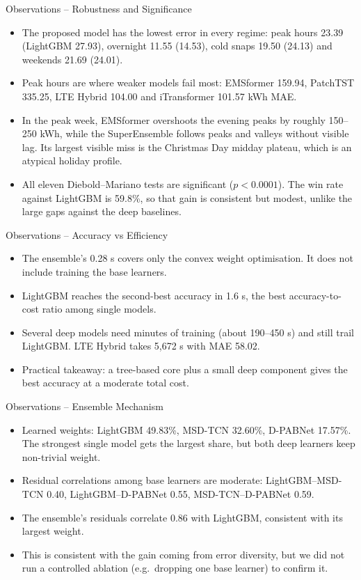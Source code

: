 \documentclass[aspectratio=169]{beamer}
\begin{document}
\begin{frame}{Observations -- Robustness and Significance}
  \small
  \begin{itemize}
    \item The proposed model has the lowest error in every regime: peak hours 23.39 (LightGBM 27.93), overnight 11.55 (14.53), cold snaps 19.50 (24.13) and weekends 21.69 (24.01).
    \item Peak hours are where weaker models fail most: EMSformer 159.94, PatchTST 335.25, LTE Hybrid 104.00 and iTransformer 101.57 kWh MAE.
    \item In the peak week, EMSformer overshoots the evening peaks by roughly 150--250 kWh, while the SuperEnsemble follows peaks and valleys without visible lag. Its largest visible miss is the Christmas Day midday plateau, which is an atypical holiday profile.
    \item All eleven Diebold--Mariano tests are significant ($p<0.0001$). The win rate against LightGBM is 59.8\%, so that gain is consistent but modest, unlike the large gaps against the deep baselines.
  \end{itemize}
\end{frame}

\begin{frame}{Observations -- Accuracy vs Efficiency}
  \small
  \begin{itemize}
    \item The ensemble's 0.28 s covers only the convex weight optimisation. It does not include training the base learners.
    \item LightGBM reaches the second-best accuracy in 1.6 s, the best accuracy-to-cost ratio among single models.
    \item Several deep models need minutes of training (about 190--450 s) and still trail LightGBM. LTE Hybrid takes 5,672 s with MAE 58.02.
    \item Practical takeaway: a tree-based core plus a small deep component gives the best accuracy at a moderate total cost.
  \end{itemize}
\end{frame}

\begin{frame}{Observations -- Ensemble Mechanism}
  \small
  \begin{itemize}
    \item Learned weights: LightGBM 49.83\%, MSD-TCN 32.60\%, D-PABNet 17.57\%. The strongest single model gets the largest share, but both deep learners keep non-trivial weight.
    \item Residual correlations among base learners are moderate: LightGBM--MSD-TCN 0.40, LightGBM--D-PABNet 0.55, MSD-TCN--D-PABNet 0.59.
    \item The ensemble's residuals correlate 0.86 with LightGBM, consistent with its largest weight.
    \item This is consistent with the gain coming from error diversity, but we did not run a controlled ablation (e.g.\ dropping one base learner) to confirm it.
  \end{itemize}
\end{frame}
\end{document}
